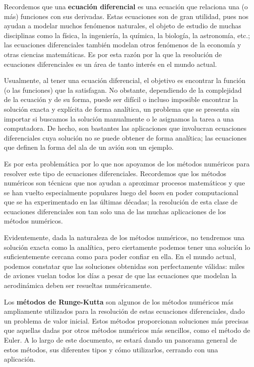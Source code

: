 \documentclass[12pt, a4paper]{article}
\begin{document}
\sffamily


\tableofcontents
\newpage

Recordemos que una \textbf{ecuación diferencial} es una ecuación que relaciona una (o más) funciones con sus derivadas. Estas ecuaciones son de gran utilidad, pues nos ayudan a modelar muchos fenómenos naturales, el objeto de estudio de muchas disciplinas como la física, la ingeniería, la química, la biología, la astronomía, etc.; las ecuaciones diferenciales también modelan otros fenómenos de la economía y otras ciencias matemáticas. Es por esta razón por la que la resolución de ecuaciones diferenciales es un área de tanto interés en el mundo actual.

Usualmente, al tener una ecuación diferencial, el objetivo es encontrar la función (o las funciones) que la satisfagan. No obstante, dependiendo de la complejidad de la ecuación y de su forma, puede ser difícil o incluso imposible encontrar la solución exacta y explícita de forma analítica, un problema que se presenta sin importar si buscamos la solución manualmente o le asignamos la tarea a una computadora. De hecho, son bastantes las aplicaciones que involucran ecuaciones diferenciales cuya solución no se puede obtener de forma analítica; las ecuaciones que definen la forma del ala de un avión son un ejemplo.

Es por esta problemática por lo que nos apoyamos de los métodos numéricos para resolver este tipo de ecuaciones diferenciales. Recordemos que los métodos numéricos son técnicas que nos ayudan a aproximar procesos matemáticos y que se han vuelto especialmente populares luego del \textit{boom} en poder computacional que se ha experimentado en las últimas décadas; la resolución de esta clase de ecuaciones diferenciales son tan solo una de las muchas aplicaciones de los métodos numéricos.

Evidentemente, dada la naturaleza de los métodos numéricos, no tendremos una solución exacta como la analítica, pero ciertamente podemos tener una solución lo suficientemente cercana como para poder confiar en ella. En el mundo actual, podemos constatar que las soluciones obtenidas son perfectamente válidas: miles de aviones vuelan todos los días a pesar de que las ecuaciones que modelan la aerodinámica deben ser resueltas numéricamente.

Los \textbf{métodos de Runge-Kutta} son algunos de los métodos numéricos más ampliamente utilizados para la resolución de estas ecuaciones diferenciales, dado un problema de valor inicial. Estos métodos proporcionan soluciones más precisas que aquellas dadas por otros métodos numéricos más sencillos, como el método de Euler. A lo largo de este documento, se estará dando un panorama general de estos métodos, sus diferentes tipos y cómo utilizarlos, cerrando con una aplicación.
\end{document}
